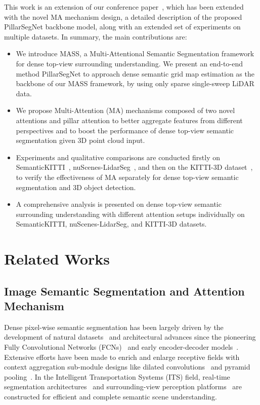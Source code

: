 \documentclass[lettersize,journal]{IEEEtran}
\begin{document}
This work is an extension of our conference paper~\cite{fei2021pillarsegnet}, which has been extended with the novel MA mechanism design, a detailed description of the proposed PillarSegNet backbone model, along with an extended set of experiments on multiple datasets.
In summary, the main contributions are:
\begin{itemize}
    \item We introduce MASS, a Multi-Attentional Semantic Segmentation framework for dense top-view surrounding understanding. We present an end-to-end method PillarSegNet to approach dense semantic grid map estimation as the backbone of our MASS framework, by using only sparse single-sweep LiDAR data.
    \item We propose Multi-Attention (MA) mechanisms composed of two novel attentions and pillar attention to better aggregate features from different perspectives and to boost the performance of dense top-view semantic segmentation given 3D point cloud input.
    \item Experiments and qualitative comparisons are conducted firstly on SemanticKITTI~\cite{semantic_kitti}, nuScenes-LidarSeg~\cite{nuscenes}, and then on the KITTI-3D dataset~\cite{kitti}, to verify the effectiveness of MA separately for dense top-view semantic segmentation and 3D object detection.
    \item A comprehensive analysis is presented on dense top-view semantic surrounding understanding with different attention setups individually on SemanticKITTI, nuScenes-LidarSeg, and KITTI-3D datasets.
\end{itemize}

\section{Related Works}

\subsection{Image Semantic Segmentation and Attention Mechanism}

Dense pixel-wise semantic segmentation has been largely driven by the development of natural datasets~\cite{kitti,deep_multi_modal} and architectural advances since the pioneering Fully Convolutional Networks (FCNs)~\cite{fcn} and early encoder-decoder models~\cite{unet,segnet}.
Extensive efforts have been made to enrich and enlarge receptive fields with context aggregation sub-module designs like dilated convolutions~\cite{multi_scale} and pyramid pooling~\cite{deeplabv2,pspnet}.
In the Intelligent Transportation Systems (ITS) field, real-time segmentation architectures~\cite{erfnet,omnirange} and surrounding-view perception platforms~\cite{restricted,ooss} are constructed for efficient and complete semantic scene understanding.
\end{document}
